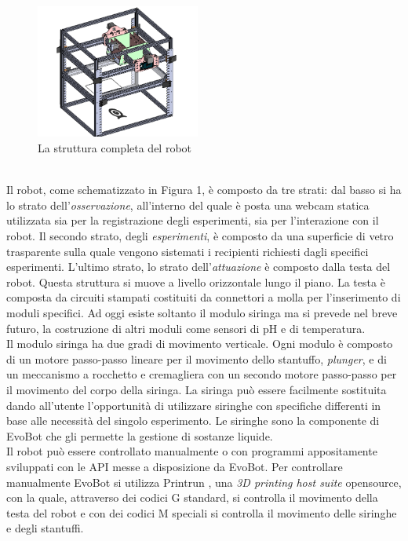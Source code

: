 \begin{figure}
\begin{center}
	  \includegraphics[width=0.48\textwidth]{immagini/observational-layer.png}
\end{center}
	 \caption{La struttura completa del robot}
	\end{figure} 
\\Il robot, come schematizzato in Figura 1, è composto da tre strati: dal basso si ha lo strato dell'\emph{osservazione}, all'interno del quale è posta una webcam statica utilizzata sia per la registrazione degli esperimenti, sia per l'interazione con il robot. Il secondo strato, degli \emph{esperimenti}, è composto da una superficie di vetro trasparente sulla quale vengono sistemati i recipienti richiesti dagli specifici esperimenti. L'ultimo strato, lo strato dell'\emph{attuazione} è composto dalla testa del robot. Questa struttura si muove a livello orizzontale lungo il piano. La testa è composta da circuiti stampati costituiti da connettori a molla per l'inserimento di moduli specifici. Ad oggi esiste soltanto il modulo siringa ma si prevede nel breve futuro, la costruzione di altri moduli come sensori di pH e di temperatura. 
\\Il modulo siringa ha due gradi di movimento verticale. Ogni modulo è composto di un motore passo-passo lineare per il movimento dello stantuffo, \emph{plunger}, e di un meccanismo a rocchetto e cremagliera con un secondo motore passo-passo per il movimento del corpo della siringa. La siringa può essere facilmente sostituita dando all'utente l'opportunità di utilizzare siringhe con specifiche differenti in base alle necessità del singolo esperimento. Le siringhe sono la componente di EvoBot che gli permette la gestione di sostanze liquide. 
\\Il robot può essere controllato manualmente o con programmi appositamente sviluppati con le API messe a disposizione da EvoBot. Per controllare manualmente EvoBot si utilizza Printrun \cite{printrun}, una \emph{3D printing host suite}  opensource, con la quale, attraverso dei codici G standard, si controlla il movimento della testa del robot e con dei codici M speciali si controlla il movimento delle siringhe e degli stantuffi.

